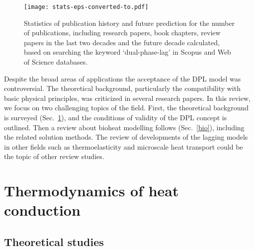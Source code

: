\documentclass[sn-mathphys]{sn-jnl}%
\theoremstyle{thmstyleone}%
\theoremstyle{thmstyletwo}%
\theoremstyle{thmstylethree}%
\begin{document}
{	\begin{figure}
		\label{Fig1:stat}
		\centering
		\texttt{[image: stats-eps-converted-to.pdf]}
		\caption{Statistics of publication history and future prediction for the number of publications, including research papers, book chapters, review papers in the last two decades and the future decade calculated, based on searching the keyword `dual-phase-lag' in Scopus and Web of Science databases.}
	\end{figure}
	
	
	{
		Despite the broad areas of applications the acceptance of the DPL model was controversial. The theoretical background, particularly the compatibility with basic physical principles, was criticized in several research papers. 
		In this review, we focus on two challenging topics of the field. First, the theoretical background is surveyed (Sec.~\ref{therm}), and the conditions of validity of the DPL concept is outlined. Then a review about bioheat modelling follows (Sec.~\ref{bio}), including the related solution methods. The review of developments of the lagging models in other fields such as thermoelasticity and microscale heat transport could be the topic of other review studies.
	}


\section{Thermodynamics of heat conduction}
\label{therm}

\subsection{Theoretical studies}
}
\end{document}
